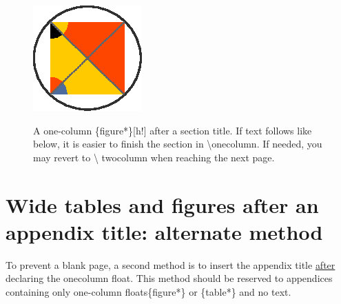 \documentclass{aa}
\begin{document}
\begin{appendix}
\begin{figure}[h!]
    \centering
     \resizebox{12cm}{12cm}
    {\includegraphics {figure.eps}}
     \caption{A one-column \{figure*\}[h!] after a section title.
      If text follows like below, it is easier to finish the section in
      \textbackslash onecolumn. If needed, you may revert to \textbackslash
      twocolumn when reaching the next page.}
      \label{fig5ap}
\end{figure}


\lipsum[1-2]


\FloatBarrier %
\twocolumn
\begin{table}[h!]
\section{Wide tables and figures after an appendix title: alternate method}
%

To prevent a blank page, a second method is to insert
the appendix title \underline{after} declaring the onecolumn float.
\newline This method should be reserved to appendices
containing only one-column floats\{figure*\} or \{table*\}
and no text.


\end{table}
\end{appendix}
\end{document}
